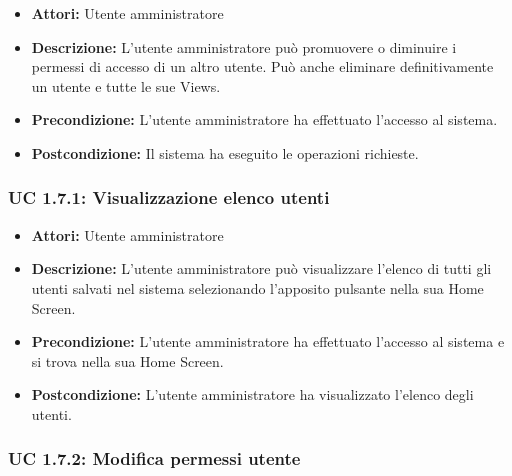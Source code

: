 \begin{itemize}
    \item \textbf{Attori:} Utente amministratore
    \item \textbf{Descrizione:} L'utente amministratore può promuovere o diminuire i permessi di accesso di un altro utente. Può anche eliminare definitivamente un utente e tutte le sue Views.
    \item \textbf{Precondizione:} L'utente amministratore ha effettuato l'accesso al sistema.
    \item \textbf{Postcondizione:} Il sistema ha eseguito le operazioni richieste.
\end{itemize}

\subsubsection{UC 1.7.1: Visualizzazione elenco utenti}

\begin{itemize}
    \item \textbf{Attori:} Utente amministratore
    \item \textbf{Descrizione:} L'utente amministratore può visualizzare l'elenco di tutti gli utenti salvati nel sistema selezionando l'apposito pulsante nella sua Home Screen.
    \item \textbf{Precondizione:} L'utente amministratore ha effettuato l'accesso al sistema e si trova nella sua Home Screen.
    \item \textbf{Postcondizione:} L'utente amministratore ha visualizzato l'elenco degli utenti.
\end{itemize}

\subsubsection{UC 1.7.2: Modifica permessi utente}

